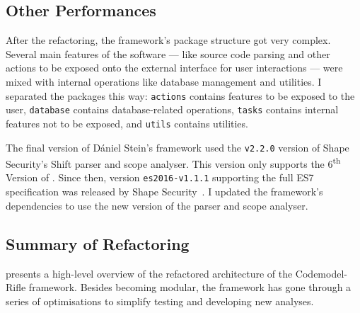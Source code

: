 \subsection{Other Performances}

After the refactoring, the framework's package structure got very complex. Several main features of the software — like source code parsing and other actions to be exposed onto the external interface for user interactions — were mixed with internal operations like database management and utilities. I separated the packages this way: \lstinline{actions} contains features to be exposed to the user, \lstinline{database} contains database-related operations, \lstinline{tasks} contains internal features not to be exposed, and \lstinline{utils} contains utilities.

The final version of Dániel Stein's framework used the \lstinline{v2.2.0} version of Shape Security's Shift parser and scope analyser. This version only supports the 6\textsuperscript{th} Version of \es. Since then, version \lstinline{es2016-v1.1.1} supporting the full ES7 specification was released by Shape Security~\cite{shift-ast, shift-java-github}. I updated the framework's dependencies to use the new version of the parser and scope analyser.

\subsection{Summary of Refactoring}

 presents a high-level overview of the refactored architecture of the Codemodel-Rifle framework. Besides becoming modular, the framework has gone through a series of optimisations to simplify testing and developing new analyses.

